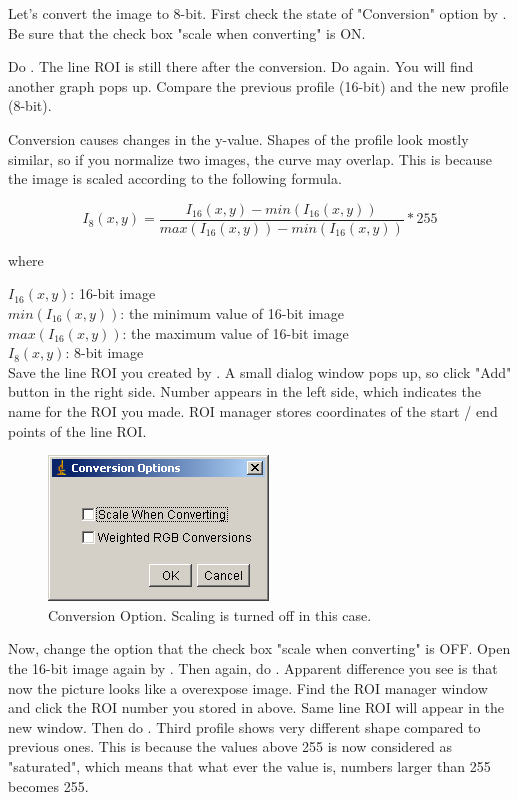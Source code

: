 \begin{indentexercise}{1}
Let's convert the image to 8-bit. First check the state
of "Conversion" option by
. Be
sure that the check box "scale when
converting" is ON. 



Do . The line
ROI is still there after the conversion. Do again. 
You will find another graph pops up. Compare the previous profile (16-bit) and the new profile (8-bit).

Conversion causes changes in the y-value. Shapes of the profile look
mostly similar, so if you normalize two images, the curve may overlap.
This is because the image is scaled according to the following
formula.

\[
I_{8}(x,y) = \frac{I_{16}(x, y) - min(I_{16}(x,y))}{ max(I_{16}(x,y)) -  min(I_{16}(x,y))} *255
\]

where

$I_{16}(x, y)$: 16-bit image\\
$min(I_{16}(x,y))$: the minimum value of 16-bit image\\
$max(I_{16}(x,y))$: the maximum value of 16-bit image\\
$I_{8}(x, y)$: 8-bit image\\


Save the line ROI you created by . A small dialog window pops up, so
click "Add" button in the right side.
Number appears in the left side, which indicates the name for the ROI
you made. ROI manager stores coordinates of the start / end points of
the line ROI.

\begin{figure}[htbp]
\begin{center}
\includegraphics[width=5.847cm,height=3.863cm]{fig/CMCIBasicCourse201102-img8.png}
\caption{Conversion Option. Scaling is turned off in this case. }
\label{fig:img8}
\end{center}
\end{figure}

Now, change the option  that the check box "scale when
converting" is OFF. Open the 16-bit image again by
. Then
again, do .
Apparent difference you see is that now the picture looks like a
overexpose image. Find the ROI manager window and click the ROI number
you stored in above. Same line ROI will appear in the new window. Then
do . Third profile
shows very different shape compared to previous ones. This is because
the values above 255 is now considered as
"saturated", which means that what ever the
value is, numbers larger than 255 becomes 255.


\end{indentexercise}
